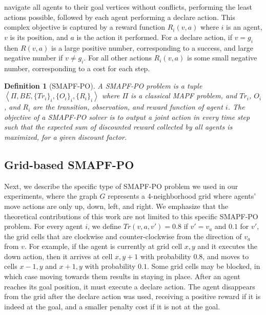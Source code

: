 \documentclass[letterpaper]{article} %
\newcommand{\tuple}[1]{\ensuremath{\left \langle #1 \right \rangle }}
\newtheorem{definition}{Definition}
\begin{document}
navigate all agents to their goal vertices without conflicts, performing the least actions possible, followed by each agent performing a declare action.
This complex objective is captured by a reward function $R_i(v,a)$ where $i$ is an agent, $v$ is its position, and $a$ is the action it performed.
For a declare action, if $v=g_i$ then $R(v,a)$ is a large positive number, corresponding to a success, and large negative number if $v \neq g_i$.  For all other actions $R_i(v,a)$ is some small negative number, corresponding to a cost for each step.

\begin{definition}[SMAPF-PO]
A SMAPF-PO problem is a tuple $\tuple{\Pi,BE,\{Tr_i\}_i, \{O_i\}_i, \{R_i\}_i}$ where $\Pi$ is a classical MAPF problem, and $Tr_i$, $O_i$, and $R_i$ are the transition, observation, and reward function of agent $i$.
The objective of a SMAPF-PO solver is to output a joint action in every time step such that the expected sum of discounted reward collected by all agents is maximized, for a given discount factor.
\end{definition}



\subsection{Grid-based SMAPF-PO}

Next, we describe the specific type of SMAPF-PO problem we used in our experiments, where the graph $G$ represents a 4-neighborhood grid where agents' move actions are only up, down, left, and right. We emphasize that the theoretical contributions of this work are not limited to this specific SMAPF-PO problem.
For every agent $i$, we define $Tr(v,a,v')=0.8$ if $v'=v_a$ and $0.1$ for $v'$, the grid cells that are clockwise and counter-clockwise from the direction of $v_a$ from $v$.
For example, if the agent is currently at grid cell $x,y$ and it executes the down action, then it arrives at cell $x,y+1$ with probability $0.8$, and moves to cells $x-1,y$ and $x+1,y$ with probability $0.1$.
Some grid cells may be blocked, in which case moving towards them results in staying in place.
After an agent reaches its goal position, it must execute a declare action. The agent disappears from the grid after the declare action was used, receiving a positive reward if it is indeed at the goal, and a smaller penalty cost if it is not at the goal.
\end{document}
